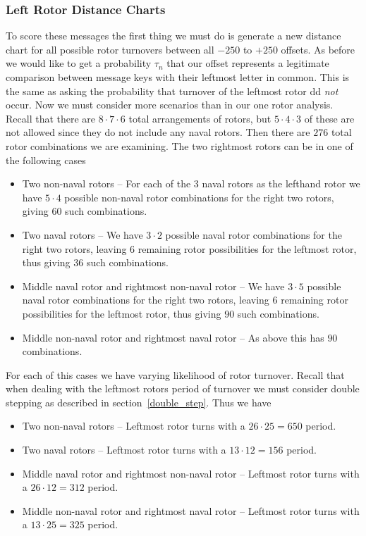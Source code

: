 \subsubsection{Left Rotor Distance Charts}
To score these messages the first thing we must do is generate a
new distance chart for all possible rotor turnovers between all
$-250$ to $+250$ offsets. As before we would like to get a
probability $\tau_n$ that our offset represents a legitimate
comparison between message keys with their leftmost letter in
common. This is the same as asking the probability that turnover of
the leftmost rotor dd \emph{not} occur. Now we must consider
more scenarios than in our one rotor analysis. Recall that there
are $8\cdot7\cdot6$ total arrangements of rotors, but
$5\cdot4\cdot3$ of these are not allowed since they do not include
any naval rotors. Then there are $276$ total rotor combinations we
are examining. The two rightmost rotors can be in one of the following cases
\begin{itemize}
  \item Two non-naval rotors -- For each of the $3$ naval rotors as
    the lefthand rotor we have $5\cdot4$ possible non-naval rotor
    combinations for the right two rotors, giving $60$ such combinations.
  \item Two naval rotors --  We have $3\cdot2$ possible naval rotor
    combinations for the right two rotors, leaving $6$ remaining
    rotor possibilities for the leftmost rotor, thus giving $36$
    such combinations.
  \item Middle naval rotor and rightmost non-naval rotor --  We
    have $3\cdot5$ possible naval rotor combinations for the right
    two rotors, leaving $6$ remaining rotor possibilities for the
    leftmost rotor, thus giving $90$ such combinations.
  \item Middle non-naval rotor and rightmost naval rotor --  As
    above this has $90$ combinations.
\end{itemize}

For each of this cases we have varying likelihood of rotor
turnover. Recall that when dealing with the leftmost rotors period
of turnover we must consider double stepping as described in
section~\ref{double_step}. Thus we have

\begin{itemize}
  \item Two non-naval rotors -- Leftmost rotor turns with a
    $26\cdot25 = 650$ period.
  \item Two naval rotors --  Leftmost rotor turns with a $13\cdot12
    = 156$ period.
  \item Middle naval rotor and rightmost non-naval rotor --
    Leftmost rotor turns with a $26\cdot12 = 312$ period.
  \item Middle non-naval rotor and rightmost naval rotor --
    Leftmost rotor turns with a $13\cdot25 = 325$ period.
\end{itemize}

